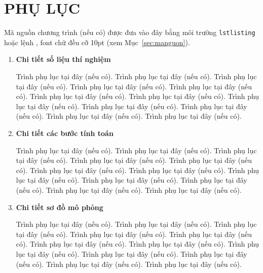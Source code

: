 \section*{\centering PHỤ LỤC}


Mã nguồn chương trình (nếu có) được đưa vào đây bằng môi trường \texttt{lstlisting} hoặc lệnh \verb||, font chữ đều cỡ 10pt (xem Mục~\ref{sec:manguon}).

\begin{enumerate}[label=\textbf{A\arabic*.}]
  
    \item  \textbf{Chi tiết số liệu thí nghiệm}
    
    Trình phụ lục tại đây (nếu có). Trình phụ lục tại đây (nếu có). Trình phụ lục tại đây (nếu có). Trình phụ lục tại đây (nếu có). Trình phụ lục tại đây (nếu có). Trình phụ lục tại đây (nếu có). Trình phụ lục tại đây (nếu có). Trình phụ lục tại đây (nếu có). Trình phụ lục tại đây (nếu có). Trình phụ lục tại đây (nếu có). Trình phụ lục tại đây (nếu có). Trình phụ lục tại đây (nếu có).
    \item  \textbf{Chi tiết các bước tính toán}
    
    Trình phụ lục tại đây (nếu có). Trình phụ lục tại đây (nếu có). Trình phụ lục tại đây (nếu có). Trình phụ lục tại đây (nếu có). Trình phụ lục tại đây (nếu có). Trình phụ lục tại đây (nếu có). Trình phụ lục tại đây (nếu có). Trình phụ lục tại đây (nếu có). Trình phụ lục tại đây (nếu có). Trình phụ lục tại đây (nếu có). Trình phụ lục tại đây (nếu có). Trình phụ lục tại đây (nếu có).
    \item  \textbf{Chi tiết sơ đồ mô phỏng}
    
    Trình phụ lục tại đây (nếu có). Trình phụ lục tại đây (nếu có). Trình phụ lục tại đây (nếu có). Trình phụ lục tại đây (nếu có). Trình phụ lục tại đây (nếu có). Trình phụ lục tại đây (nếu có). Trình phụ lục tại đây (nếu có). Trình phụ lục tại đây (nếu có). Trình phụ lục tại đây (nếu có). Trình phụ lục tại đây (nếu có). Trình phụ lục tại đây (nếu có). Trình phụ lục tại đây (nếu có).
    
\end{enumerate}
